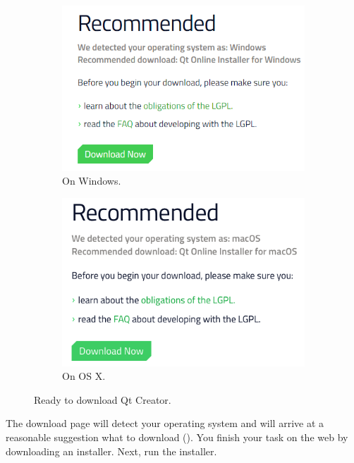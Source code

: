 \begin{figure} %
\centering
\begin{subfigure}{.5\textwidth}
  \centering
  \includegraphics[width=.9\textwidth]{graphics/qt-io-5-win.png}
  \caption{On Windows.}
\end{subfigure}%
\begin{subfigure}{.5\textwidth}
  \centering
  \includegraphics[width=.9\textwidth]{graphics/qt-io-5-osx.png}
  \caption{On OS X.}
\end{subfigure}
\caption{Ready to download Qt Creator.}
\label{fig:qt-recommended}
\end{figure}

The download page will detect your operating system and will arrive at a reasonable suggestion what to download (). You finish your task on the web by downloading an installer. Next, run the installer.

